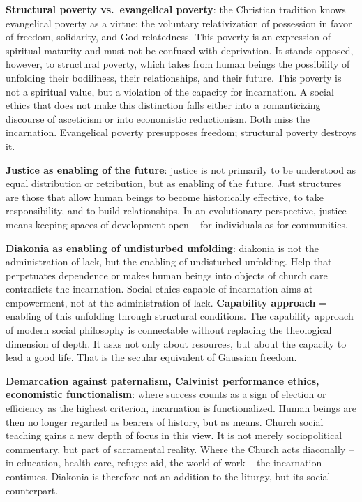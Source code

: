 \documentclass[
  english,
]{article}
\begin{document}
\textbf{Structural poverty vs.~evangelical poverty}: the Christian
tradition knows evangelical poverty as a virtue: the voluntary
relativization of possession in favor of freedom, solidarity, and
God-relatedness. This poverty is an expression of spiritual maturity and
must not be confused with deprivation. It stands opposed, however, to
structural poverty, which takes from human beings the possibility of
unfolding their bodiliness, their relationships, and their future. This
poverty is not a spiritual value, but a violation of the capacity for
incarnation. A social ethics that does not make this distinction falls
either into a romanticizing discourse of asceticism or into economistic
reductionism. Both miss the incarnation. Evangelical poverty presupposes
freedom; structural poverty destroys it.

\textbf{Justice as enabling of the future}: justice is not primarily to
be understood as equal distribution or retribution, but as enabling of
the future. Just structures are those that allow human beings to become
historically effective, to take responsibility, and to build
relationships. In an evolutionary perspective, justice means keeping
spaces of development open -- for individuals as for communities.

\textbf{Diakonia as enabling of undisturbed unfolding}: diakonia is not
the administration of lack, but the enabling of undisturbed unfolding.
Help that perpetuates dependence or makes human beings into objects of
church care contradicts the incarnation. Social ethics capable of
incarnation aims at empowerment, not at the administration of lack.
\textbf{Capability approach} = enabling of this unfolding through
structural conditions. The capability approach of modern social
philosophy is connectable without replacing the theological dimension of
depth. It asks not only about resources, but about the capacity to lead
a good life. That is the secular equivalent of Gaussian freedom.

\textbf{Demarcation against paternalism, Calvinist performance ethics,
economistic functionalism}: where success counts as a sign of election
or efficiency as the highest criterion, incarnation is functionalized.
Human beings are then no longer regarded as bearers of history, but as
means. Church social teaching gains a new depth of focus in this view.
It is not merely sociopolitical commentary, but part of sacramental
reality. Where the Church acts diaconally -- in education, health care,
refugee aid, the world of work -- the incarnation continues. Diakonia is
therefore not an addition to the liturgy, but its social counterpart.
\end{document}
